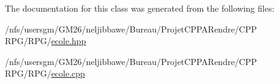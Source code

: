 The documentation for this class was generated from the following files\-:\begin{DoxyCompactItemize}
\item 
/nfs/usersgm/\-G\-M26/neljibbawe/\-Bureau/\-Projet\-C\-P\-P\-A\-Rendre/\-C\-P\-P R\-P\-G/\-R\-P\-G/\hyperlink{ecole_8hpp}{ecole.\-hpp}\item 
/nfs/usersgm/\-G\-M26/neljibbawe/\-Bureau/\-Projet\-C\-P\-P\-A\-Rendre/\-C\-P\-P R\-P\-G/\-R\-P\-G/\hyperlink{ecole_8cpp}{ecole.\-cpp}\end{DoxyCompactItemize}
